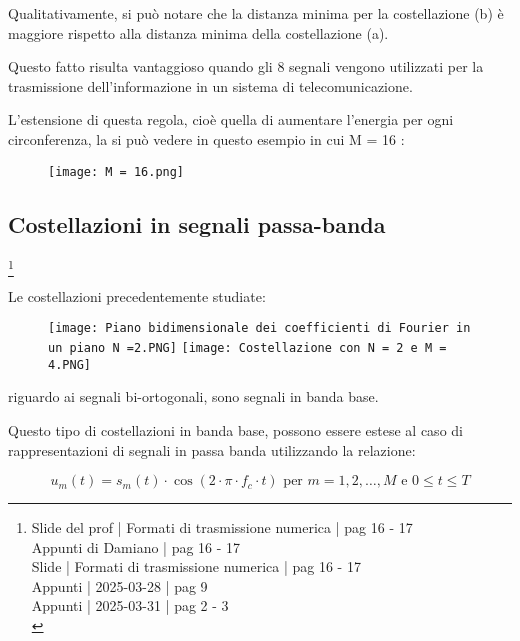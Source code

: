 Qualitativamente, si può notare che la distanza minima per la costellazione (b) è maggiore rispetto alla distanza minima della costellazione (a). \newline 

Questo fatto risulta vantaggioso quando gli 8 segnali vengono utilizzati per la trasmissione dell'informazione in un sistema di telecomunicazione. \newline 

\newpage 

L'estensione di questa regola, cioè quella di aumentare l'energia per ogni circonferenza, 
la si può vedere in questo esempio in cui M = 16 : 

\begin{figure}[h]
    \centering
    \texttt{[image: M = 16.png]}
\end{figure}

\newpage 

\subsection{Costellazioni in segnali passa-banda}
\footnote{Slide del prof | Formati di trasmissione numerica | pag 16 - 17\\  
Appunti di Damiano | pag 16 - 17\\
Slide | Formati di trasmissione numerica | pag  16 - 17\\
Appunti | 2025-03-28 | pag 9 \\ 
Appunti | 2025-03-31 | pag 2 - 3 \\ 
}

Le costellazioni precedentemente studiate: 

\begin{figure}[h]
    \centering
    \texttt{[image: Piano bidimensionale dei coefficienti di Fourier in un piano N =2.PNG]}
    \texttt{[image: Costellazione con N = 2 e M = 4.PNG]}
\end{figure}

riguardo ai segnali bi-ortogonali, 
sono segnali in banda base. \newline 

Questo tipo di costellazioni in banda base, possono essere estese al caso di rappresentazioni di segnali in passa banda utilizzando la relazione: 

{
    \Large 
    \begin{equation}
        u_m (t) 
        = 
        s_m (t)
        \cdot 
        \cos(2 \cdot \pi \cdot f_c \cdot t) 
        \text{ per } m = 1, 2, \dots, M \text{ e } 0 \le t \le T
    \end{equation}
}

